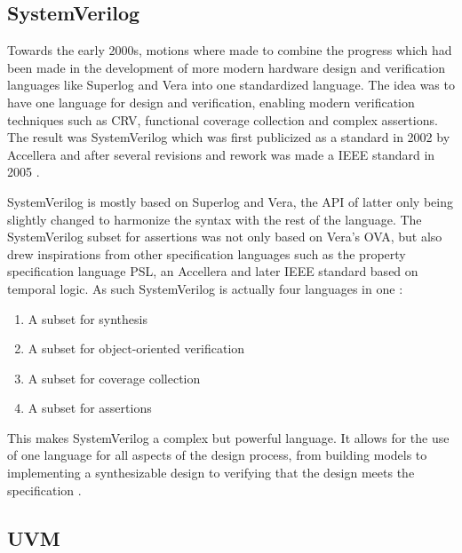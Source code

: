 \subsection{SystemVerilog} %

Towards the early 2000s, motions where made to combine the progress which had been made in the development of more
modern hardware design and verification languages like Superlog and Vera into one standardized language. The idea was
to have one language for design and verification, enabling modern verification techniques such as CRV, functional
coverage collection and complex assertions. The result was SystemVerilog which was first publicized as a standard in
2002 by Accellera and after several revisions and rework was made a IEEE standard in 2005 \cite[Sec. 9]{flake2020a}.

SystemVerilog is mostly based on Superlog and Vera, the API of latter only being slightly changed to harmonize the
syntax with the rest of the language. The SystemVerilog subset for assertions was not only based on Vera's OVA, but
also drew inspirations from other specification languages such as the property specification language PSL, an
Accellera and later IEEE standard based on temporal logic. As such SystemVerilog is actually four languages in one
\cite[Ch. 1]{mehta2021introduction}:

\begin{enumerate}
  \item A subset for synthesis
  \item A subset for object-oriented verification
  \item A subset for coverage collection
  \item A subset for assertions
\end{enumerate}

This makes SystemVerilog a complex but powerful language. It allows for the use of one language for all aspects of
the design process, from building models to implementing a synthesizable design to verifying that the design meets
the specification \cite[Ch. 1]{mehta2021introduction}.

\subsection{UVM} %

